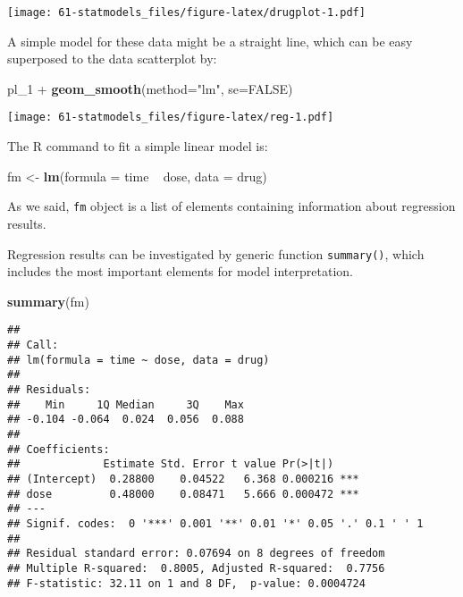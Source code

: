 \documentclass[]{book}
\newenvironment{Shaded}{\begin{snugshade}}{\end{snugshade}}
\newcommand{\KeywordTok}[1]{\textcolor[rgb]{0.13,0.29,0.53}{\textbf{{#1}}}}
\newcommand{\DataTypeTok}[1]{\textcolor[rgb]{0.13,0.29,0.53}{{#1}}}
\newcommand{\StringTok}[1]{\textcolor[rgb]{0.31,0.60,0.02}{{#1}}}
\newcommand{\OtherTok}[1]{\textcolor[rgb]{0.56,0.35,0.01}{{#1}}}
\newcommand{\NormalTok}[1]{{#1}}
\begin{document}
\texttt{[image: 61-statmodels\_files/figure-latex/drugplot-1.pdf]}

A simple model for these data might be a straight line, which can be
easy superposed to the data scatterplot by:

\begin{Shaded}
\begin{Highlighting}[]
\NormalTok{pl_1 +}\StringTok{ }\KeywordTok{geom_smooth}\NormalTok{(}\DataTypeTok{method=}\StringTok{"lm"}\NormalTok{, }\DataTypeTok{se=}\OtherTok{FALSE}\NormalTok{) }
\end{Highlighting}
\end{Shaded}

\texttt{[image: 61-statmodels\_files/figure-latex/reg-1.pdf]}

The R command to fit a simple linear model is:

\begin{Shaded}
\begin{Highlighting}[]
\NormalTok{fm <-}\StringTok{ }\KeywordTok{lm}\NormalTok{(}\DataTypeTok{formula =} \NormalTok{time ~}\StringTok{ }\NormalTok{dose, }\DataTypeTok{data =} \NormalTok{drug)}
\end{Highlighting}
\end{Shaded}

As we said, \texttt{fm} object is a list of elements containing
information about regression results.

Regression results can be investigated by generic function
\texttt{summary()}, which includes the most important elements for model
interpretation.

\begin{Shaded}
\begin{Highlighting}[]
\KeywordTok{summary}\NormalTok{(fm)}
\end{Highlighting}
\end{Shaded}

\begin{verbatim}
## 
## Call:
## lm(formula = time ~ dose, data = drug)
## 
## Residuals:
##    Min     1Q Median     3Q    Max 
## -0.104 -0.064  0.024  0.056  0.088 
## 
## Coefficients:
##             Estimate Std. Error t value Pr(>|t|)    
## (Intercept)  0.28800    0.04522   6.368 0.000216 ***
## dose         0.48000    0.08471   5.666 0.000472 ***
## ---
## Signif. codes:  0 '***' 0.001 '**' 0.01 '*' 0.05 '.' 0.1 ' ' 1
## 
## Residual standard error: 0.07694 on 8 degrees of freedom
## Multiple R-squared:  0.8005, Adjusted R-squared:  0.7756 
## F-statistic: 32.11 on 1 and 8 DF,  p-value: 0.0004724
\end{verbatim}
\end{document}
